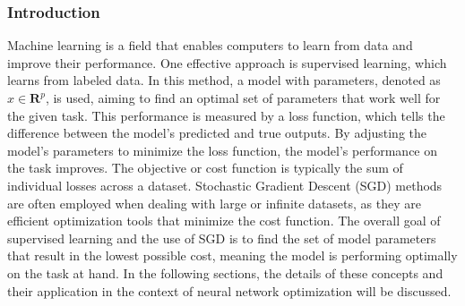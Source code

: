 \subsubsection{Introduction}
Machine learning is a field that enables computers to learn from data and improve their performance. One effective approach is supervised learning, which learns from labeled data. In this method, a model with parameters, denoted as $x \in \mathbf{R}^{p}$, is used, aiming to find an optimal set of parameters that work well for the given task. This performance is measured by a loss function, which tells the difference between the model's predicted and true outputs. By adjusting the model's parameters to minimize the loss function, the model's performance on the task improves. The objective or cost function is typically the sum of individual losses across a dataset. Stochastic Gradient Descent (SGD) methods are often employed when dealing with large or infinite datasets, as they are efficient optimization tools that minimize the cost function. The overall goal of supervised learning and the use of SGD is to find the set of model parameters that result in the lowest possible cost, meaning the model is performing optimally on the task at hand. In the following sections, the details of these concepts and their application in the context of neural network optimization will be discussed.
\begin{comment}
Machine learning is a powerful field that allows computers to learn from data, improving their performance on a task without being explicitly programmed. Among the various approaches in machine learning, supervised learning stands out due to its effectiveness in learning from labeled data. In supervised learning, we use a model with parameters, denoted as $x \in \mathbf{R}^{p}$, where $p$ is the number of parameters. The aim is to find an optimal set of parameters that perform well on a given task. This performance is often measured by a loss function, which quantifies the difference between the model's predicted output and the true output. The model's parameters are adjusted to minimize this loss function, thereby improving the performance of the model on the task. The objective or cost function is typically defined as the sum of the individual losses across a dataset. When the number of samples $n$ in the dataset is large, potentially even infinite, it becomes computationally expensive to compute the loss for all samples at once. In such scenarios, Stochastic Gradient Descent (SGD) methods are often employed. These methods are efficient optimization tools that enable us to minimize the cost function even when dealing with large or infinite datasets. Overall, the goal of supervised learning and the use of SGD is to find the set of model parameters that result in the lowest possible cost, meaning the model is performing optimally on the task at hand. In the following sections, we delve into the details of these concepts and their application in the context of neural network optimization.
\end{comment}
